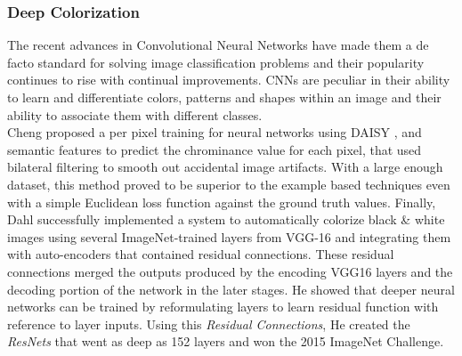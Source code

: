 \documentclass[10pt,twocolumn,letterpaper]{article}
\begin{document}
\subsubsection{Deep Colorization}
\hspace*{0.167 in}The recent advances in Convolutional Neural Networks have made them a de facto standard for solving image classification problems and their popularity continues to rise with continual improvements. CNNs are peculiar in their ability to learn and differentiate colors, patterns and shapes within an image and their ability to associate them with different classes.\\
\hspace*{0.167 in}Cheng \etal\cite{cheng2016deep} proposed a per pixel training for neural networks using DAISY \cite{tola2008descriptor}, and semantic \cite{long2015semantic} features to predict the chrominance value for each pixel, that used bilateral filtering to smooth out accidental image artifacts. With a large enough dataset, this method proved to be superior to the example based techniques even with a simple Euclidean loss function against the ground truth values. Finally, Dahl\cite{dahl2016automatic} successfully implemented a system to automatically colorize black \& white images using several ImageNet-trained layers from VGG-16 \cite{simonyan2015deep} and integrating them with auto-encoders that contained residual connections. These residual connections merged the outputs produced by the encoding VGG16 layers and the decoding portion of the network in the later stages. He \etal\cite{he2015deep} showed that deeper neural networks can be trained by reformulating layers to learn residual function with reference to layer inputs. Using this \textit{Residual Connections}, He \etal\cite{he2015deep} created the \textit{ResNets} that went as deep as 152 layers and won the 2015 ImageNet Challenge.
\end{document}
